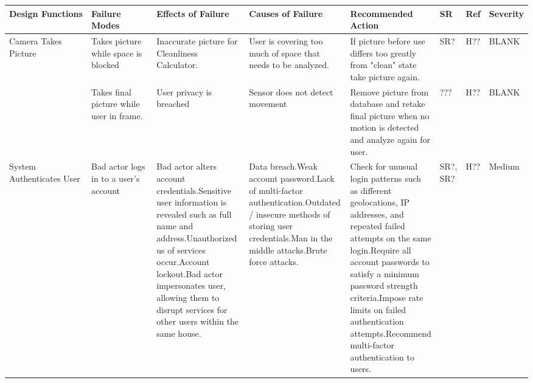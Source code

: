 \documentclass{article}
\begin{document}
\begin{table}[H]
\begin{adjustbox}{width=\textwidth}
\begin{tabular}{|p{0.30\linewidth} | p{0.30\linewidth} | p{0.20\linewidth}|  p{0.20\linewidth}|  p{0.30\linewidth}|  p{0.07\linewidth}|  p{0.07\linewidth}|p{0.12\linewidth}| }
    \hline
         \textbf{Design Functions} & \textbf{Failure Modes} & \textbf{Effects of Failure} & \textbf{Causes of Failure} & \textbf{Recommended Action} & \textbf{SR} & \textbf{Ref} & \textbf{Severity}\\
         \hline
         Camera Takes Picture & Takes picture while space is blocked\newline & Inaccurate picture for Cleanliness Calculator.\newline & User is covering too much of space that needs to be analyzed.\newline & If picture before use differs too greatly from "clean" state take picture again. & SR? & H?? & BLANK\\
          & Takes final picture while user in frame. & User privacy is breached & Sensor does not detect movement& Remove picture from database and retake final picture when no motion is detected and analyze again for user.  & ??? & H?? & BLANK\\
         \hline
         System Authenticates User & Bad actor logs in to a user's account& Bad actor alters account credentials.\newline\newline Sensitive user information is revealed such as full name and address.\newline\newline Unauthorized us of services occur.\newline\newline Account lockout.\newline\newline Bad actor impersonates user, allowing them to disrupt services for other users within the same house. & Data breach.\newline\newline Weak account password.\newline\newline Lack of multi-factor authentication.\newline\newline Outdated / insecure methods of storing user credentials.\newline\newline Man in the middle attacks.\newline\newline Brute force attacks. & Check for unusual login patterns such as different geolocations, IP addresses, and repeated failed attempts on the same login.\newline\newline Require all account passwords to satisfy a minimum password strength criteria.\newline\newline Impose rate limits on failed authentication attempts.\newline\newline Recommend multi-factor authentication to users. & SR?, SR? & H?? & Medium\\

\end{tabular}
\end{adjustbox}
\end{table}
\end{document}
